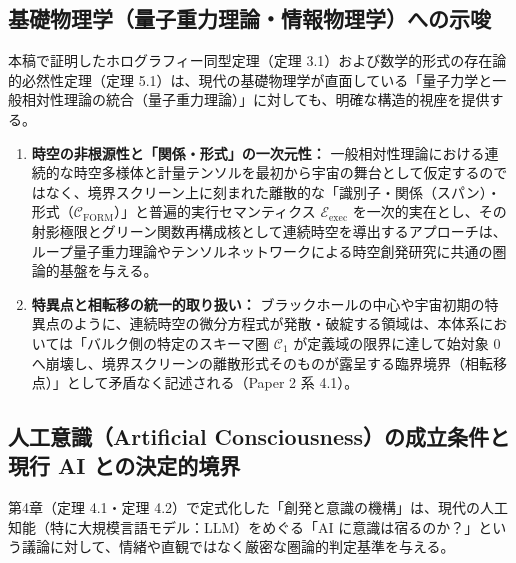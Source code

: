 \documentclass[11pt,a4paper]{ltjsarticle}
\theoremstyle{definition}
\theoremstyle{plain}
\begin{document}
\subsection{基礎物理学（量子重力理論・情報物理学）への示唆}
本稿で証明したホログラフィー同型定理（定理 3.1）および数学的形式の存在論的必然性定理（定理 5.1）は、現代の基礎物理学が直面している「量子力学と一般相対性理論の統合（量子重力理論）」に対しても、明確な構造的視座を提供する。

\begin{enumerate}
    \item \textbf{時空の非根源性と「関係・形式」の一次元性：}
    一般相対性理論における連続的な時空多様体と計量テンソルを最初から宇宙の舞台として仮定するのではなく、境界スクリーン上に刻まれた離散的な「識別子・関係（スパン）・形式（$\mathcal{C}_{\mathrm{FORM}}$）」と普遍的実行セマンティクス $\mathcal{E}_{\mathrm{exec}}$ を一次的実在とし、その射影極限とグリーン関数再構成核として連続時空を導出するアプローチは、ループ量子重力理論やテンソルネットワークによる時空創発研究に共通の圏論的基盤を与える。
    \item \textbf{特異点と相転移の統一的取り扱い：}
    ブラックホールの中心や宇宙初期の特異点のように、連続時空の微分方程式が発散・破綻する領域は、本体系においては「バルク側の特定のスキーマ圏 $\mathcal{C}_1$ が定義域の限界に達して始対象 $0$ へ崩壊し、境界スクリーンの離散形式そのものが露呈する臨界境界（相転移点）」として矛盾なく記述される（Paper 2 \cite{Ota2026_2} 系 4.1）。
\end{enumerate}

\subsection{人工意識（Artificial Consciousness）の成立条件と現行 AI との決定的境界}
第4章（定理 4.1・定理 4.2）で定式化した「創発と意識の機構」は、現代の人工知能（特に大規模言語モデル：LLM）をめぐる「AI に意識は宿るのか？」という議論に対して、情緒や直観ではなく厳密な圏論的判定基準を与える。
\end{document}
